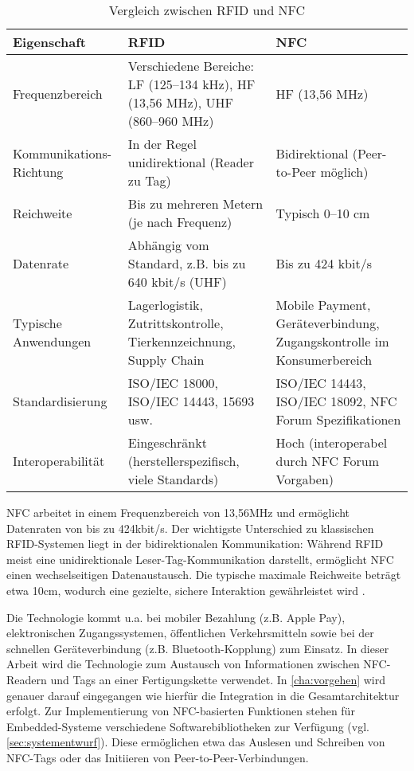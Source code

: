 \begin{table}[H]
	\centering
	\caption{Vergleich zwischen RFID und NFC}
	\label{tab:rfid_vs_nfc}
	\begin{tabular}{|p{4cm}|p{4.5cm}|p{4.5cm}|}
		\hline
		\textbf{Eigenschaft} & \textbf{RFID} & \textbf{NFC} \\
		\hline
		Frequenzbereich & Verschiedene Bereiche: LF (125–134 kHz), HF (13,56 MHz), UHF (860–960 MHz) & HF (13,56 MHz) \\
		\hline
		Kommunikations- Richtung & In der Regel unidirektional (Reader zu Tag) & Bidirektional (Peer-to-Peer möglich) \\
		\hline
		Reichweite & Bis zu mehreren Metern (je nach Frequenz) & Typisch 0–10 cm \\
		\hline
		Datenrate & Abhängig vom Standard, z.B. bis zu 640 kbit/s (UHF) & Bis zu 424 kbit/s \\
		\hline
		Typische Anwendungen & Lagerlogistik, Zutrittskontrolle, Tierkennzeichnung, Supply Chain & Mobile Payment, Geräteverbindung, Zugangskontrolle im Konsumerbereich \\
		\hline
		Standardisierung & ISO/IEC 18000, ISO/IEC 14443, 15693 usw. & ISO/IEC 14443, ISO/IEC 18092, NFC Forum Spezifikationen \\
		\hline
		Interoperabilität & Eingeschränkt (herstellerspezifisch, viele Standards) & Hoch (interoperabel durch NFC Forum Vorgaben) \\
		\hline
	\end{tabular}
\end{table}

NFC arbeitet in einem Frequenzbereich von 13,56MHz und ermöglicht Datenraten von bis zu 424kbit/s. Der wichtigste Unterschied zu klassischen RFID-Systemen liegt in der bidirektionalen Kommunikation: Während RFID meist eine unidirektionale Leser-Tag-Kommunikation darstellt, ermöglicht NFC einen wechselseitigen Datenaustausch. Die typische maximale Reichweite beträgt etwa 10cm, wodurch eine gezielte, sichere Interaktion gewährleistet wird \autocite[Seite 47 Tabelle 3.6]{finkenzeller2023}. 

Die Technologie kommt u.a. bei mobiler Bezahlung (z.B. Apple Pay), elektronischen Zugangssystemen, öffentlichen Verkehrsmitteln sowie bei der schnellen Geräteverbindung (z.B. Bluetooth-Kopplung) zum Einsatz. In dieser Arbeit wird die Technologie zum Austausch von Informationen zwischen NFC-Readern und Tags an einer Fertigungskette verwendet. In \autoref{cha:vorgehen} wird genauer darauf eingegangen wie hierfür die Integration in die Gesamtarchitektur erfolgt. Zur Implementierung von NFC-basierten Funktionen stehen für Embedded-Systeme verschiedene Softwarebibliotheken zur Verfügung (vgl. \ref{sec:systementwurf}). Diese ermöglichen etwa das Auslesen und Schreiben von NFC-Tags oder das Initiieren von Peer-to-Peer-Verbindungen.



